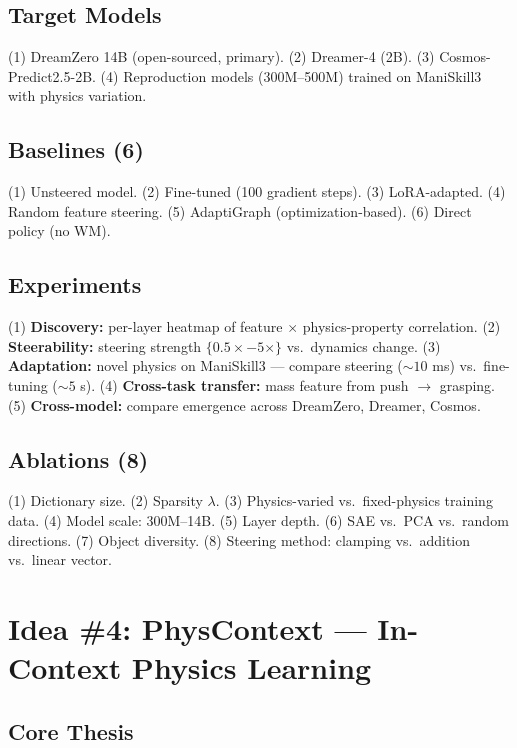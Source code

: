 \documentclass[11pt,a4paper]{article}
\begin{document}
\subsection{Target Models}
(1) DreamZero 14B (open-sourced, primary). (2) Dreamer-4 (2B). (3) Cosmos-Predict2.5-2B. (4) Reproduction models (300M--500M) trained on ManiSkill3 with physics variation.

\subsection{Baselines (6)}
(1) Unsteered model. (2) Fine-tuned (100 gradient steps). (3) LoRA-adapted. (4) Random feature steering. (5) AdaptiGraph (optimization-based). (6) Direct policy (no WM).

\subsection{Experiments}
(1) \textbf{Discovery:} per-layer heatmap of feature $\times$ physics-property correlation. (2) \textbf{Steerability:} steering strength $\{0.5\times{-}5\times\}$ vs.\ dynamics change. (3) \textbf{Adaptation:} novel physics on ManiSkill3 --- compare steering (${\sim}10$ ms) vs.\ fine-tuning (${\sim}5$ s). (4) \textbf{Cross-task transfer:} mass feature from push $\to$ grasping. (5) \textbf{Cross-model:} compare emergence across DreamZero, Dreamer, Cosmos.

\subsection{Ablations (8)}
(1) Dictionary size. (2) Sparsity $\lambda$. (3) Physics-varied vs.\ fixed-physics training data. (4) Model scale: 300M--14B. (5) Layer depth. (6) SAE vs.\ PCA vs.\ random directions. (7) Object diversity. (8) Steering method: clamping vs.\ addition vs.\ linear vector.

\newpage
\section{Idea \#4: PhysContext --- In-Context Physics Learning}
\label{sec:physcontext}

\subsection{Core Thesis}
\end{document}
